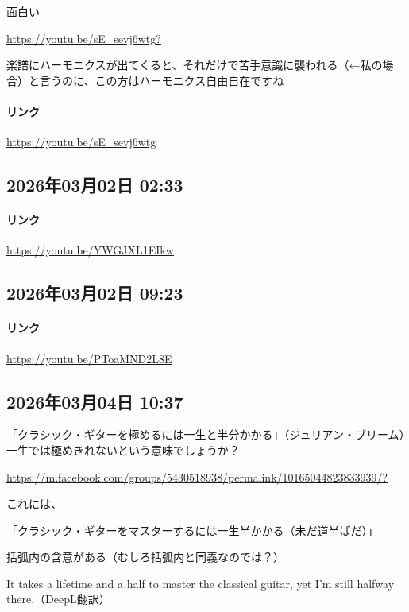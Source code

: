 面白い

\url{https://youtu.be/sE_sevj6wtg?}

楽譜にハーモニクスが出てくると、それだけで苦手意識に襲われる（←私の場合）と言うのに、この方はハーモニクス自由自在ですね

\paragraph{リンク}
\url{https://youtu.be/sE_sevj6wtg}

\subsection*{2026年03月02日 02:33}

\paragraph{リンク}
\url{https://youtu.be/YWGJXL1EIkw}

\subsection*{2026年03月02日 09:23}

\paragraph{リンク}
\url{https://youtu.be/PToaMND2L8E}

\subsection*{2026年03月04日 10:37}

「クラシック・ギターを極めるには一生と半分かかる」（ジュリアン・ブリーム）一生では極めきれないという意味でしょうか？

\url{https://m.facebook.com/groups/5430518938/permalink/10165044823833939/?}

これには、

「クラシック・ギターをマスターするには一生半かかる（未だ道半ばだ）」

括弧内の含意がある（むしろ括弧内と同義なのでは？）

It takes a lifetime and a half to master the classical guitar, yet I'm still halfway there.（DeepL翻訳）

